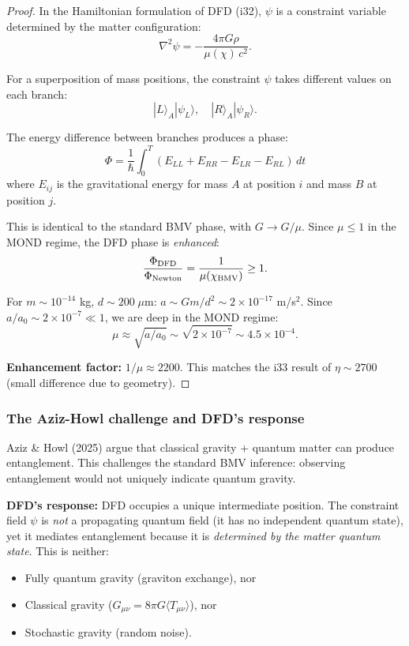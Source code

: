 \documentclass[11pt,a4paper]{article}
\begin{document}
\begin{proof}
In the Hamiltonian formulation of DFD (i32), $\psi$ is a constraint variable determined by the matter configuration:
\begin{equation}
\nabla^2\psi = -\frac{4\pi G\rho}{\mu(\chi)\,c^2}.
\end{equation}

For a superposition of mass positions, the constraint $\psi$ takes different values on each branch:
\begin{equation}
|L\rangle_A|\psi_L\rangle, \quad |R\rangle_A|\psi_R\rangle.
\end{equation}

The energy difference between branches produces a phase:
\begin{equation}
\Phi = \frac{1}{\hbar}\int_0^T (E_{LL} + E_{RR} - E_{LR} - E_{RL})\,dt
\end{equation}
where $E_{ij}$ is the gravitational energy for mass $A$ at position $i$ and mass $B$ at position $j$.

This is identical to the standard BMV phase, with $G \to G/\mu$. Since $\mu \leq 1$ in the MOND regime, the DFD phase is \emph{enhanced}:
\begin{equation}
\frac{\Phi_{\rm DFD}}{\Phi_{\rm Newton}} = \frac{1}{\mu(\chi_{\rm BMV})} \geq 1.
\end{equation}

For $m \sim 10^{-14}$ kg, $d \sim 200\;\mu$m: $a \sim Gm/d^2 \sim 2 \times 10^{-17}$ m/s$^2$. Since $a/a_0 \sim 2 \times 10^{-7} \ll 1$, we are deep in the MOND regime:
\begin{equation}
\mu \approx \sqrt{a/a_0} \sim \sqrt{2\times10^{-7}} \sim 4.5 \times 10^{-4}.
\end{equation}

\textbf{Enhancement factor:} $1/\mu \approx 2200$. This matches the i33 result of $\eta \sim 2700$ (small difference due to geometry).
\end{proof}

\subsubsection{The Aziz-Howl challenge and DFD's response}

Aziz \& Howl (2025) argue that classical gravity + quantum matter can produce entanglement. This challenges the standard BMV inference: observing entanglement would not uniquely indicate quantum gravity.

\textbf{DFD's response:} DFD occupies a unique intermediate position. The constraint field $\psi$ is \emph{not} a propagating quantum field (it has no independent quantum state), yet it mediates entanglement because it is \emph{determined by the matter quantum state}. This is neither:
\begin{itemize}
\item Fully quantum gravity (graviton exchange), nor
\item Classical gravity ($G_{\mu\nu} = 8\pi G\langle T_{\mu\nu}\rangle$), nor
\item Stochastic gravity (random noise).
\end{itemize}
\end{document}
